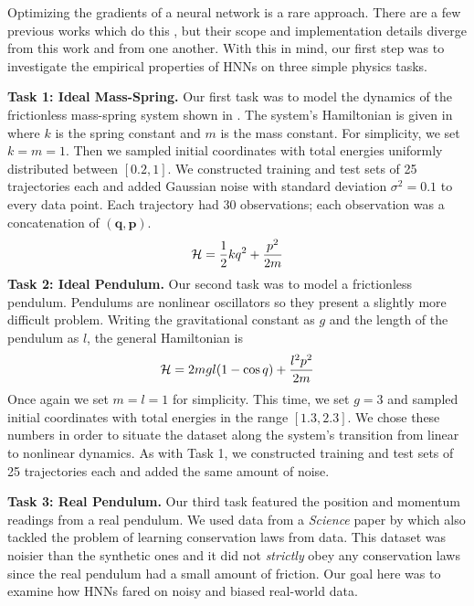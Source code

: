 \documentclass{article}
\begin{document}
Optimizing the gradients of a neural network is a rare approach. There are a few previous works which do this \cite{Wang2018Machine, Schmidt2009Distilling, pukrittayakamee2009simultaneous}, but their scope and implementation details diverge from this work and from one another. With this in mind, our first step was to investigate the empirical properties of HNNs on three simple physics tasks.

\textbf{Task 1: Ideal Mass-Spring.} Our first task was to model the dynamics of the frictionless mass-spring system shown in . The system's Hamiltonian is given in  where $k$ is the spring constant and $m$ is the mass constant. For simplicity, we set $k=m=1$. Then we sampled initial coordinates with total energies uniformly distributed between $[0.2,1]$. We constructed training and test sets of 25 trajectories each and added Gaussian noise with standard deviation $\sigma^2=0.1$ to every data point. Each trajectory had 30 observations; each observation was a concatenation of $(\textbf{q},\textbf{p})$.
\begin{equation}
\mathcal{H} = \frac{1}{2}kq^2 + \frac{p^2}{2m}
\eqnlabel{eqn4}
\end{equation}
\textbf{Task 2: Ideal Pendulum.} Our second task was to model a frictionless pendulum. Pendulums are nonlinear oscillators so they present a slightly more difficult problem. Writing the gravitational constant as $g$ and the length of the pendulum as $l$, the general Hamiltonian is
\begin{equation}
\mathcal{H} = 2 m g l (1-\cos q) + \frac{l^2p^2}{2m}
\eqnlabel{eqn5}
\end{equation}
Once again we set $m=l=1$ for simplicity. This time, we set $g=3$ and sampled initial coordinates with total energies in the range $[1.3,2.3]$. We chose these numbers in order to situate the dataset along the system's transition from linear to nonlinear dynamics. As with Task 1, we constructed training and test sets of 25 trajectories each and added the same amount of noise.

\textbf{Task 3: Real Pendulum.} Our third task featured the position and momentum readings from a real pendulum. We used data from a \textit{Science} paper by \citet{Schmidt2009Distilling} which also tackled the problem of learning conservation laws from data. This dataset was noisier than the synthetic ones and it did not \textit{strictly} obey any conservation laws since the real pendulum had a small amount of friction. Our goal here was to examine how HNNs fared on noisy and biased real-world data.
\end{document}
